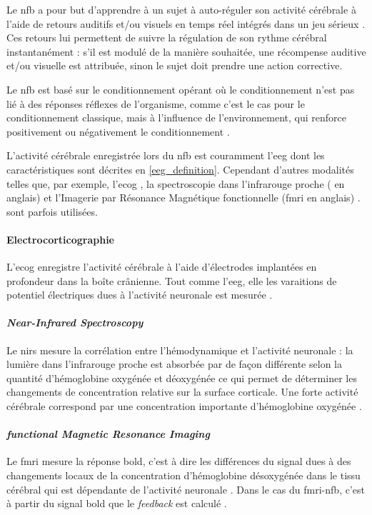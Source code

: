 Le \gls{nfb} a pour but d'apprendre à un sujet à auto-réguler son activité cérébrale à l'aide de retours auditifs et/ou visuels en temps réel
intégrés dans un jeu sérieux \citep{Wang2010}. Ces retours lui permettent de suivre la régulation de son rythme cérébral instantanément : s'il est modulé de 
la manière souhaitée, une récompense auditive et/ou visuelle est attribuée, sinon le sujet doit prendre une action corrective. 

Le \gls{nfb} est basé sur le conditionnement opérant \citep{Reynolds1975} où le conditionnement n'est pas lié à 
des réponses réflexes de l'organisme, comme c'est le cas pour le conditionnement classique, mais à l'influence de l'environnement, qui 
renforce positivement ou négativement le conditionnement \citep{Skinner1948}. 

L'activité cérébrale enregistrée lors du \gls{nfb} est couramment l'\gls{eeg} dont les caractéristiques sont décrites en \ref{eeg_definition}.
Cependant d'autres modalités telles que, par exemple, 
l'\gls{ecog} \citep{Khanna2016, Gharabaghi2014}, la spectroscopie dans l'infrarouge proche ( en anglais) \citep{Marx2015} et 
l'Imagerie par Résonance Magnétique fonctionnelle (\gls{fmri} en anglais) \citep{Sulzer2013}.
sont parfois utilisées. 

\paragraph{Electrocorticographie} 
L'\gls{ecog} enregistre l'activité cérébrale à l'aide d'électrodes implantées en profondeur dans la boîte crânienne. Tout comme l'\gls{eeg}, 
elle les varaitions de potentiel électriques dues à l'activité neuronale est mesurée \citep{Leuthardt2006}. 

\paragraph{\textit{Near-Infrared Spectroscopy}} 
Le \gls{nirs} mesure la corrélation entre l'hémodynamique et l'activité neuronale : la lumière dans l'infrarouge proche est absorbée par de
façon différente selon la quantité d'hémoglobine oxygénée et déoxygénée ce qui permet de déterminer les changements de concentration relative
sur la surface corticale. Une forte activité cérébrale correspond par une concentration importante d'hémoglobine oxygénée \citep{Fallgatter1997, Marx2015}. 

\paragraph{\textit{functional Magnetic Resonance Imaging}} 
Le \gls{fmri} mesure la réponse \gls{bold}, c'est à dire les différences du signal dues à des changements locaux de la concentration d'hémoglobine désoxygénée 
dans le tissu cérébral qui est dépendante de l'activité neuronale \citep{Dewiputri2013}. Dans le cas du \gls{fmri}-\gls{nfb}, c'est à partir du signal 
\gls{bold} que le \textit{feedback} est calculé \citep{Dewiputri2013}. 

